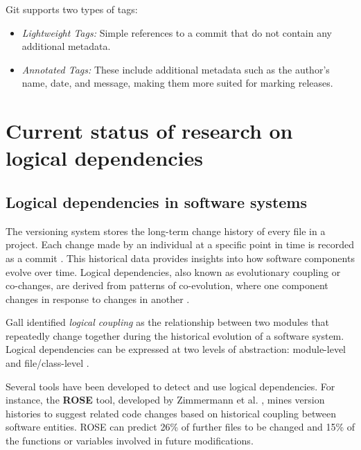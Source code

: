 Git supports two types of tags:
\begin{itemize}
    \item \textit{Lightweight Tags:} Simple references to a commit that do not contain any additional metadata.
    \item \textit{Annotated Tags:} These include additional metadata such as the author's name, date, and message, making them more suited for marking releases.
\end{itemize}



\section{Current status of research on logical dependencies}
\label{ld-intro}

\subsection{Logical dependencies in software systems}

\hspace{4em}The versioning system stores the long-term change history of every file in a project. Each change made by an individual at a specific point in time is recorded as a commit \cite{7471284}. This historical data provides insights into how software components evolve over time. Logical dependencies, also known as evolutionary coupling or co-changes, are derived from patterns of co-evolution, where one component changes in response to changes in another \cite{Yu:2007:UCC:1231330.1231370, Beck:2011:CMC:2025113.2025162}.

Gall \cite{Gall:1998:DLC:850947.853338, Gall:2003:CRH:942803.943741, 6606615} identified \textit{logical coupling} as the relationship between two modules that repeatedly change together during the historical evolution of a software system. Logical dependencies can be expressed at two levels of abstraction: module-level \cite{LD-module-new} and file/class-level \cite{Gall:2003:CRH:942803.943741, inproceedings-gall}.

Several tools have been developed to detect and use logical dependencies. For instance, the \textbf{ROSE} tool, developed by Zimmermann et al. \cite{Zimmermann:2004:MVH:998675.999460}, mines version histories to suggest related code changes based on historical coupling between software entities. ROSE can predict 26\% of further files to be changed and 15\% of the functions or variables involved in future modifications.

